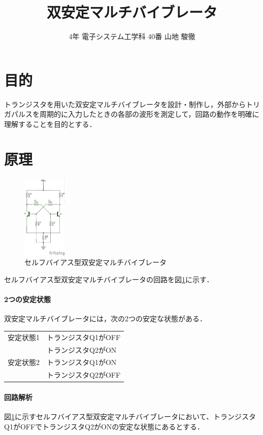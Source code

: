 \documentclass[10pt, a4j, dvipdfmx]{jarticle}
\title{双安定マルチバイブレータ}
\author{4年 電子システム工学科 40番  山地 駿徹}
\begin{document}
    \section{目的}
    トランジスタを用いた双安定マルチバイブレータを設計・制作し，外部からトリガパルスを周期的に入力したときの各部の波形を測定して，回路の動作を明確に理解することを目的とする．

    \section{原理}
    \begin{figure}
        \vspace*{-\intextsep}
        \begin{center}
        \includegraphics[height=40mm]{images/fig-1.png}
        \caption{セルフバイアス型双安定マルチバイブレータ}
        \label{fig:1}
        \end{center}
    \end{figure}
       
    セルフバイアス型双安定マルチバイブレータの回路を図\ref{fig:1}に示す．

    \paragraph{2つの安定状態}
    双安定マルチバイブレータには，次の2つの安定な状態がある．\\
    \begin{tabular}{ll}
        安定状態1 & トランジスタQ1がOFF\\
         & トランジスタQ2がON \\
        安定状態2 & トランジスタQ1がON \\
         & トランジスタQ2がOFF \\
    \end{tabular}

    \paragraph{回路解析}
    図\ref{fig:1}に示すセルフバイアス型双安定マルチバイブレータにおいて、トランジスタQ1がOFFでトランジスタQ2がONの安定な状態にあるとする．
\end{document}
